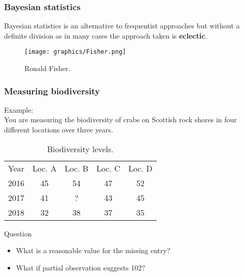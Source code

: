 \documentclass{beamer}
\newcommand{\1}{\ensuremath{\mathbf{1}}}
\begin{document}
%
%
%
\begin{frame}\frametitle{Bayesian statistics}
	Bayesian statistics is an alternative to frequentist approaches but without a definite division as in many cases the approach taken is \textbf{eclectic}.
	\begin{figure}
	\begin{center}
		\texttt{[image: graphics/Fisher.png]}
	\end{center}
	\caption{Ronald Fisher.}
	\end{figure}
\end{frame}
%
%
%
%
%
%
\begin{frame}\frametitle{Measuring biodiversity}
	Example:\\
	You are measuring the biodiversity of crabs on Scottish rock shores in four different locations over three years.
	\begin{table}
		\caption{Biodiversity levels.}
		\begin{tabular}{c|cccc}
			Year	& Loc. A	& Loc. B	& Loc. C	& Loc. D \\
			2016	& 45		& 54		& 47		& 52 \\
			2017	& 41		& ?			& 43		& 45 \\
			2018	& 32		& 38		& 37		& 35 \\
		\end{tabular}
	\end{table}
	\begin{block}{Question}
		\begin{itemize}
			\item What is a reasonable value for the missing entry?
			\item What if partial observation suggests 102?
		\end{itemize}
	\end{block}
\end{frame}
\end{document}
